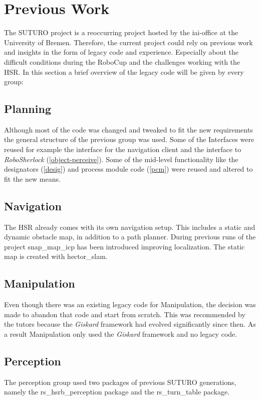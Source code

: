 \documentclass[main.tex]{subfiles}
\begin{document}
	\section{Previous Work}
    \label{previous_work}
		The SUTURO project is a reoccurring project hosted by the iai-office at the University of Bremen. Therefore, the current project could rely on previous work and insights in the form of legacy code and experience. Especially about the difficult conditions during the RoboCup and the challenges working with the HSR. In this section a brief overview of the legacy code will be given by every group:
	\subsection{Planning}
		Although most of the code was changed and tweaked to fit the new requirements the general structure of the previous group was used. Some of the Interfaces were reused for example the interface for the navigation client and the interface to \textit{RoboSherlock} (\ref{object-perceive}). Some of the mid-level functionality like the designators (\ref{desig}) and process module code (\ref{pcm}) were reused and altered to fit the new means.
	\subsection{Navigation}
		The HSR already comes with its own navigation setup. This includes a static and dynamic obstacle map, in addition to a path planner. During previous runs of the project snap\_map\_icp has been introduced improving localization. The static map is created with hector\_slam.
	\subsection{Manipulation}
		Even though there was an existing legacy code for Manipulation, the decision was made to abandon that code and start from scratch. This was recommended by the tutors because the \textit{Giskard} framework had evolved significantly since then. As a result Manipulation only used the \textit{Giskard} framework and no legacy code.
	\subsection{Perception}
	The perception group used two packages of previous SUTURO generations, namely the rs\_hsrb\_perception package and the rs\_turn\_table package.
	
\end{document}
